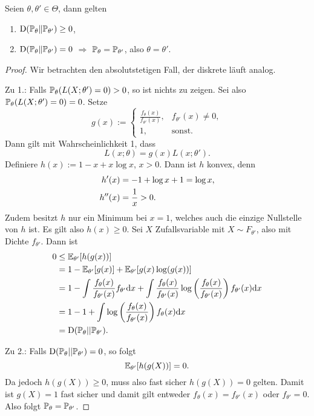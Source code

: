 \begin{lem} %
  Seien $\theta, \theta' \in \Theta$, dann gelten
  \begin{enumerate}
  \item $\operatorname*{D}( \mathbb{P}_\theta \| \mathbb{P}_{\theta'} ) \ge 0$,
  \item $\operatorname*{D}( \mathbb{P}_\theta \| \mathbb{P}_{\theta'} ) = 0$ $\Rightarrow$ $\mathbb{P}_\theta =
    \mathbb{P}_{\theta'}$, also $\theta = \theta'$.
  \end{enumerate}
\end{lem}

\begin{proof}
  Wir betrachten den absolutstetigen Fall, der diskrete läuft analog.

  Zu 1.: Falls $\mathbb{P}_\theta( L(X; \theta') = 0 ) > 0$, so ist nichts zu zeigen.
  Sei also $\mathbb{P}_\theta( L(X; \theta') = 0 ) = 0$. Setze
  \[ g(x) := \begin{cases}
      \frac{f_\theta(x)}{f_{\theta'}(x)}, & f_{\theta'}(x) \ne 0, \\
      1, &\text{sonst.}
    \end{cases}
  \]
  Dann gilt mit Wahrscheinlichkeit 1, dass
  \[ L(x; \theta) = g(x) L( x; \theta' ). \]
  Definiere $h(x) := 1 - x + x \log x$, $x > 0$. Dann ist $h$ konvex, denn
  \begin{align*}
    h'(x) &= -1 + \log x +1 = \log x, \\
    h''(x) &= \frac{1}{x} > 0.
  \end{align*}
  Zudem besitzt $h$ nur ein Minimum bei $x = 1$, welches auch die einzige
  Nullstelle von $h$ ist. Es gilt also $h(x) \ge 0$. Sei $X$ Zufallsvariable mit
  $X \sim F_{\theta'}$, also mit Dichte $f_{\theta'}$. Dann ist
  \begin{align*}
    0 &\le \mathbb{E}_{\theta'}[ h(g(x)) ] \\
      &= 1 - \mathbb{E}_{\theta'}[g(x)] + \mathbb{E}_{\theta'}[g(x) \log(g(x))] \\
      &= 1- \int \frac{f_\theta(x)}{f_{\theta'}(x)} f_{\theta'} \mathrm{d} x +
        \int \frac{f_\theta(x)}{f_{\theta'}(x)}
        \log \left( \frac{f_\theta(x)}{f_{\theta'}(x)} \right)
        f_{\theta'}(x) \mathrm{d} x \\
      &= 1 - 1 + \int
        \log \left( \frac{f_\theta(x)}{f_{\theta'}(x)} \right)
        f_\theta(x)\mathrm{d} x \\
      &= \operatorname*{D}( \mathbb{P}_\theta || \mathbb{P}_{\theta'} ).
  \end{align*}

  Zu 2.: Falls $\operatorname*{D}( \mathbb{P}_\theta || \mathbb{P}_{\theta'} ) = 0$, so folgt
  \[ \mathbb{E}_{\theta'}[ h(g(X))] = 0. \]
  Da jedoch $h(g(X)) \ge 0$, muss also fast sicher $h(g(X)) = 0$ gelten. Damit
  ist $g(X) = 1$ fast sicher und damit gilt entweder $f_\theta(x) =
  f_{\theta'}(x)$ oder $f_{\theta'} = 0$. Also folgt $\mathbb{P}_\theta = \mathbb{P}_{\theta'}$.
\end{proof}

